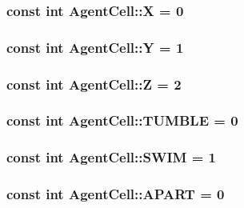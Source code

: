 \subsubsection{\setlength{\rightskip}{0pt plus 5cm}const int {\bf AgentCell::X} = 0\hspace{0.3cm}{\tt  [static]}}\label{classAgentCell_5c0b87937b202c75f50781de7eca7ecd}


\subsubsection{\setlength{\rightskip}{0pt plus 5cm}const int {\bf AgentCell::Y} = 1\hspace{0.3cm}{\tt  [static]}}\label{classAgentCell_4b8411d4e514c1b303d501e75986d1d1}


\subsubsection{\setlength{\rightskip}{0pt plus 5cm}const int {\bf AgentCell::Z} = 2\hspace{0.3cm}{\tt  [static]}}\label{classAgentCell_8cd12d521800e9c192b2727f70c94428}


\subsubsection{\setlength{\rightskip}{0pt plus 5cm}const int {\bf AgentCell::TUMBLE} = 0\hspace{0.3cm}{\tt  [static]}}\label{classAgentCell_9afc71c0adff826448b4a548ef0be123}


\subsubsection{\setlength{\rightskip}{0pt plus 5cm}const int {\bf AgentCell::SWIM} = 1\hspace{0.3cm}{\tt  [static]}}\label{classAgentCell_53d091073e56980ba2db853b23f17eb8}


\subsubsection{\setlength{\rightskip}{0pt plus 5cm}const int {\bf AgentCell::APART} = 0\hspace{0.3cm}{\tt  [static]}}\label{classAgentCell_e387293f0fa5076fb7de511e184d009c}


